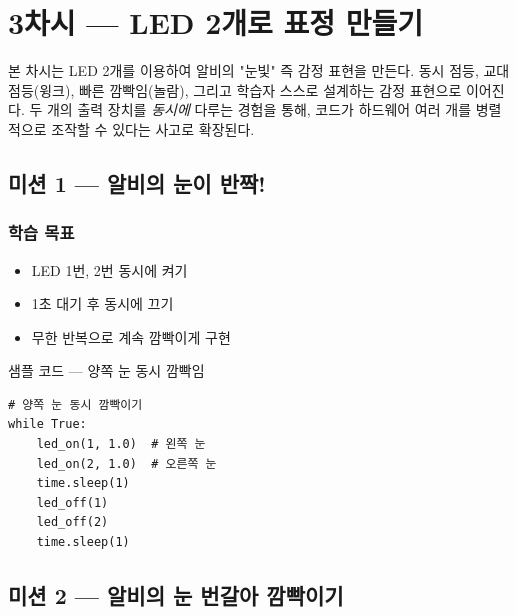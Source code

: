 \section{3차시 --- LED 2개로 표정 만들기}
\label{sec:ch03}

본 차시는 LED 2개를 이용하여 알비의 "눈빛" 즉 감정 표현을 만든다.
동시 점등, 교대 점등(윙크), 빠른 깜빡임(놀람), 그리고 학습자 스스로
설계하는 감정 표현으로 이어진다. 두 개의 출력 장치를 \emph{동시에}
다루는 경험을 통해, 코드가 하드웨어 여러 개를 병렬적으로 조작할 수
있다는 사고로 확장된다.

\subsection{미션 1 --- 알비의 눈이 반짝!}
\label{subsec:ch03-m1}

\begin{storybox}
\end{storybox}

\subsubsection*{학습 목표}
\begin{itemize}[leftmargin=1.4em]
  \item LED 1번, 2번 동시에 켜기
  \item 1초 대기 후 동시에 끄기
  \item 무한 반복으로 계속 깜빡이게 구현
\end{itemize}

\begin{labbox}{샘플 코드 --- 양쪽 눈 동시 깜빡임}
\begin{verbatim}
# 양쪽 눈 동시 깜빡이기
while True:
    led_on(1, 1.0)  # 왼쪽 눈
    led_on(2, 1.0)  # 오른쪽 눈
    time.sleep(1)
    led_off(1)
    led_off(2)
    time.sleep(1)
\end{verbatim}
\end{labbox}

\subsection{미션 2 --- 알비의 눈 번갈아 깜빡이기}
\label{subsec:ch03-m2}

\begin{storybox}
\end{storybox}

